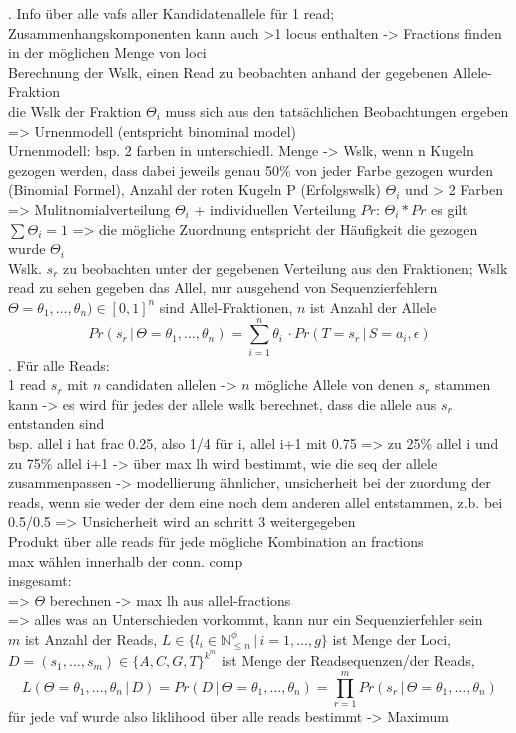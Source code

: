 . Info über alle vafs aller Kandidatenallele für 1 read; Zusammenhangskomponenten kann auch >1 locus enthalten -> Fractions finden in der möglichen Menge von loci \\
Berechnung der Wslk, einen Read zu beobachten anhand der gegebenen Allele-Fraktion\\
die Wslk der Fraktion $\Theta_{i}$ muss sich aus den tatsächlichen Beobachtungen ergeben => Urnenmodell (entspricht binominal model)\\
Urnenmodell: bsp. 2 farben in unterschiedl. Menge -> Wslk, wenn n Kugeln gezogen werden, dass dabei jeweils genau 50\% von jeder Farbe gezogen wurden (Binomial Formel), Anzahl der roten Kugeln P (Erfolgswslk) $\Theta_{i}$ und  > 2 Farben => Mulitnomialverteilung $\Theta_{i}$ + individuellen Verteilung $Pr$: $\Theta_{i} * Pr$
es gilt $\sum \Theta_{i} = 1$ => die mögliche Zuordnung entspricht der Häufigkeit die gezogen wurde $\Theta_{i}$ \\
Wslk. $ s_{r} $ zu beobachten unter der gegebenen Verteilung aus den Fraktionen; Wslk read zu sehen gegeben das Allel, nur ausgehend von Sequenzierfehlern \\
$\Theta=\theta_{1},\dots,\theta_{n}) \in [0,1]^n $ sind Allel-Fraktionen, $n$ ist Anzahl der Allele \\
\begin{equation} \label{eqn:2-17}
\tag{2-17}
Pr(s_{r} \, | \, \Theta=\theta_{1},\dots,\theta_{n}) = \sum_{i=1}^{n}\theta_{i} \, \cdotp Pr(T=s_{r} \, | \, S=a_{i}, \epsilon)
\end{equation}
. Für alle Reads: \\
1 read $s_{r}$ mit $n$ candidaten allelen -> $n$ mögliche Allele von denen $s_{r}$ stammen kann -> es wird für jedes der allele wslk berechnet, dass die allele aus $s_{r}$ entstanden sind\\
bsp. allel i hat frac 0.25, also 1/4 für i, allel i+1 mit 0.75 => zu 25\% allel i und zu 75\% allel i+1 -> über max lh wird bestimmt, wie die seq der allele zusammenpassen -> modellierung ähnlicher,  unsicherheit bei der zuordung der reads, wenn sie weder der dem eine noch dem anderen allel entstammen, z.b. bei 0.5/0.5 => Unsicherheit wird an schritt 3 weitergegeben \\
Produkt über alle reads für jede mögliche Kombination an fractions \\
max wählen innerhalb der conn. comp\\
insgesamt:\\
=> $\Theta$ berechnen -> max lh aus allel-fractions\\
=> alles was an Unterschieden vorkommt, kann nur ein Sequenzierfehler sein\\
$m$ ist Anzahl der Reads, $L \in \{l_{i} \in \mathds{N}_{\leq n}^\phi \, | \, i=1, \dots, g\}$ ist Menge der Loci, $D = (s_{1}, \dots, s_{m}) \in \{A,C, G, T\}^{k^m}$ ist Menge der Readsequenzen/der Reads,
\begin{equation} \label{eqn:2-18}
\tag{2-18}
L(\Theta=\theta_{1},\dots,\theta_{n} \, | \, D) = Pr(D \, | \, \Theta=\theta_{1},\dots,\theta_{n}) = \prod_{r=1}^{m}Pr (s_{r} \, | \, \Theta=\theta_{1},\dots,\theta_{n})
\end{equation}
für jede vaf wurde also liklihood über alle reads bestimmt -> Maximum 
